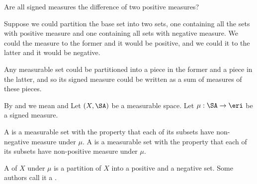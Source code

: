 
\sbasic


































\sstart
{}


Are all signed measures
the difference of two
positive measures?

Suppose we could partition
the base set into two
sets, one containing
all the sets with positive
measure and one containing
all sets with negative measure.
We could
 the measure to
the former and it would
be positive, and we could
 it to the latter
and it would be negative.

Any measurable set could be partitioned
into a piece in the former and a
piece in the latter, and so
its signed measure could be
written as a sum of measures
of these pieces.


By  and
we mean 
and 
Let $(X, \SA)$ be
a measurable space.
Let $\mu: \SA \to \eri$
be a signed measure.

A 
is a measurable set
with the property that
each of its subsets have
non-negative measure
under $\mu$.
A 
is a measurable set
with the property that
each of its subsets have
non-positive measure
under $\mu$.

A 
of $X$ under $\mu$
is a partition of $X$
into a positive and a negative set.
Some authors call it a
.

